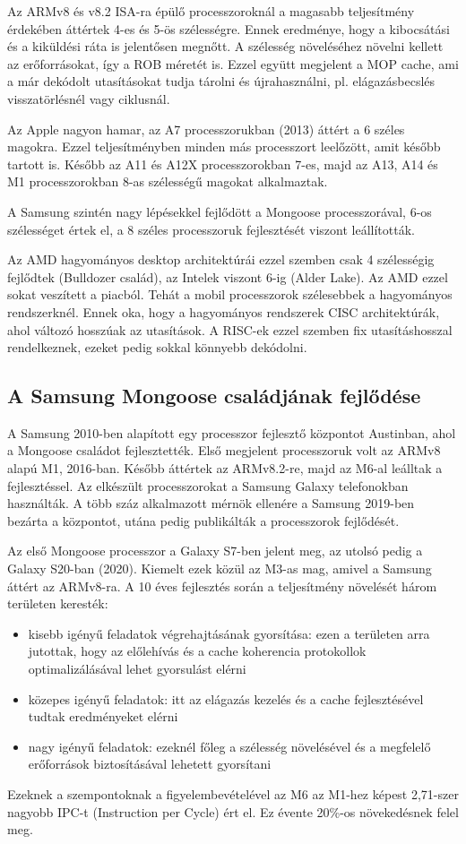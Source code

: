 Az ARMv8 és v8.2 ISA-ra épülő processzoroknál a magasabb teljesítmény érdekében áttértek 4-es és 5-ös szélességre.
Ennek eredménye, hogy a kibocsátási és a kiküldési ráta is jelentősen megnőtt.
A szélesség növeléséhez növelni kellett az erőforrásokat, így a ROB méretét is.
Ezzel együtt megjelent a MOP cache, ami a már dekódolt utasításokat tudja tárolni és újrahasználni, pl. elágazásbecslés visszatörlésnél vagy ciklusnál.

Az Apple nagyon hamar, az A7 processzorukban (2013) áttért a 6 széles magokra.
Ezzel teljesítményben minden más processzort leelőzött, amit később tartott is.
Később az A11 és A12X processzorokban 7-es, majd az A13, A14 és M1 processzorokban 8-as szélességű magokat alkalmaztak.

A Samsung szintén nagy lépésekkel fejlődött a Mongoose processzorával, 6-os szélességet értek el, a 8 széles processzoruk fejlesztését viszont leállították.

Az AMD hagyományos desktop architektúrái ezzel szemben csak 4 szélességig fejlődtek (Bulldozer család), az Intelek viszont 6-ig (Alder Lake).
Az AMD ezzel sokat veszített a piacból.
Tehát a mobil processzorok szélesebbek a hagyományos rendszerknél.
Ennek oka, hogy a hagyományos rendszerek CISC architektúrák, ahol változó hosszúak az utasítások.
A RISC-ek ezzel szemben fix utasításhosszal rendelkeznek, ezeket pedig sokkal könnyebb dekódolni.

\subsection{A Samsung Mongoose családjának fejlődése}
A Samsung 2010-ben alapított egy processzor fejlesztő központot Austinban, ahol a Mongoose családot fejlesztették.
Első megjelent processzoruk volt az ARMv8 alapú M1, 2016-ban.
Később áttértek az ARMv8.2-re, majd az M6-al leálltak a fejlesztéssel.
Az elkészült processzorokat a Samsung Galaxy telefonokban használták.
A több száz alkalmazott mérnök ellenére a Samsung 2019-ben bezárta a központot, utána pedig publikálták a processzorok fejlődését.

Az első Mongoose processzor a Galaxy S7-ben jelent meg, az utolsó pedig a Galaxy S20-ban (2020).
Kiemelt ezek közül az M3-as mag, amivel a Samsung áttért az ARMv8-ra.
A 10 éves fejlesztés során a teljesítmény növelését három területen keresték:
\begin{itemize}
    \item kisebb igényű feladatok végrehajtásának gyorsítása: ezen a területen arra jutottak, hogy az előlehívás és a cache koherencia protokollok optimalizálásával lehet gyorsulást elérni
    \item közepes igényű feladatok: itt az elágazás kezelés és a cache fejlesztésével tudtak eredményeket elérni
    \item nagy igényű feladatok: ezeknél főleg a szélesség növelésével és a megfelelő erőforrások biztosításával lehetett gyorsítani
\end{itemize}
Ezeknek a szempontoknak a figyelembevételével az M6 az M1-hez képest 2,71-szer nagyobb IPC-t (Instruction per Cycle) ért el.
Ez évente 20\%-os növekedésnek felel meg.

